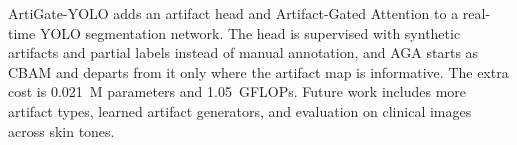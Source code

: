ArtiGate-YOLO adds an artifact head and Artifact-Gated Attention to a real-time YOLO segmentation network. The head is supervised with synthetic artifacts and partial labels instead of manual annotation, and AGA starts as CBAM and departs from it only where the artifact map is informative. The extra cost is 0.021~M parameters and 1.05~GFLOPs.  Future work includes more artifact types, learned artifact generators, and evaluation on clinical images across skin tones.
